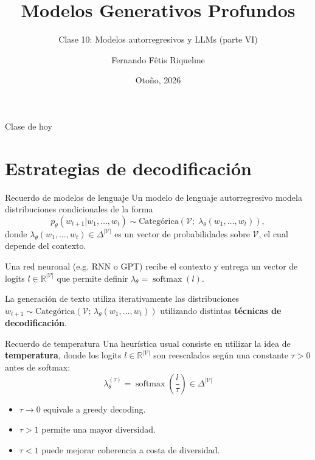 \documentclass{beamer}
\title{Modelos Generativos Profundos}
\subtitle{Clase 10: Modelos autorregresivos y LLMs (parte VI)}
\author{Fernando Fêtis Riquelme}
\institute{
    Facultad de Ciencias Físicas y Matemáticas\\
    Universidad de Chile
}
\date{Otoño, 2026}
\newcommand{\R}{\mathbb{R}}
\begin{document}
\begin{frame}
    \titlepage
\end{frame}

\begin{frame}{Clase de hoy}
    \tableofcontents
\end{frame}

\section{Estrategias de decodificación}

\begin{frame}{Recuerdo de modelos de lenguaje}
    Un modelo de lenguaje autorregresivo modela distribuciones condicionales de la forma
    \begin{equation*}
        p_\theta(w_{t+1}| w_1,\ldots,w_t)\sim\text{Categórica}\!\left(\mathcal{V};\;\lambda_\theta(w_1,\ldots,w_t)\right),
    \end{equation*}
    donde $\lambda_\theta(w_1,\ldots,w_t)\in\Delta^{|\mathcal{V}|}$ es un vector de probabilidades sobre $\mathcal{V}$, el cual depende del contexto.

    Una red neuronal (e.g. RNN o GPT) recibe el contexto y entrega un vector de logits $l\in\R^{|\mathcal{V}|}$ que permite definir $\lambda_\theta=\operatorname{softmax}(l)$.

    La generación de texto utiliza iterativamente las distribuciones $w_{t+1}\sim\text{Categórica}(\mathcal{V};\,\lambda_\theta(w_1,\ldots,w_t))$ utilizando distintas \textbf{técnicas de decodificación}.
\end{frame}

\begin{frame}{Recuerdo de temperatura}
    Una heurística usual consiste en utilizar la idea de \textbf{temperatura}, donde los logits $l\in\R^{|\mathcal{V}|}$ son reescalados según una constante $\tau>0$ antes de softmax:
    \begin{equation*}
        \lambda_\theta^{(\tau)}=\operatorname{softmax}\left(\frac{l}{\tau}\right)\in\Delta^{|\mathcal{V}|}
    \end{equation*}
    \vspace{-0.8cm}
    \begin{itemize}
        \item $\tau\to 0$ equivale a greedy decoding.
        \item $\tau>1$ permite una mayor diversidad.
        \item $\tau<1$ puede mejorar coherencia a costa de diversidad.
    \end{itemize}
\end{frame}
\end{document}
